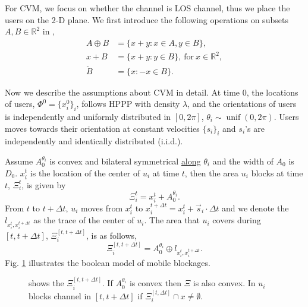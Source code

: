 \documentclass[10pt, conference, letterpaper]{IEEEtran}
\DeclareMathOperator*{\unif}{unif}
\begin{document}
For CVM, we focus on whether the channel is LOS channel, thus we place the users on the 2-D plane. 
We first introduce the following operations on subsets $A, B\in \mathbb{R}^2$ in \cite{stochasticgeometry}, 
\begin{equation*}
\begin{split}
A \oplus B & = \{x+y:x\in A, y\in B\},\\
x + B & = \{x+y:y\in B\}, \mathrm{~for~} x\in \mathbb{R}^2, \\
\check{B} & = \{x: -x \in B\}.
\end{split}
\end{equation*}

Now we describe the assumptions about CVM in detail. At time $0$, the locations of users, $\Phi^0 = \{x_i^0\}_i$, follows HPPP with density $\lambda$, and the orientations of users is independently and uniformly distributed in $[0, 2\pi]$, $\theta_i \sim \unif(0, 2\pi)$. Users moves towards their orientation at constant velocities $\{s_i\}_i$ and $s_i$'s are independently and identically distributed (i.i.d.).

Assume $A_0^{\theta_i}$ is convex and bilateral symmetrical \underline{along} $\theta_i$ and the width of $A_0$ is $D_0$. $x_i^t$ is the location of the center of $u_i$ at time $t$, then the area $u_i$ blocks at time $t$, $\Xi_{i}^t$, is given by 
\begin{equation*}
\Xi_{i}^t = x_i^t + A_0^{\theta_i}.
\end{equation*}
From $t$ to $t+\Delta t$, $u_i$ moves from $x_i^t$ to $x_i^{t+\Delta t} = x_i^t + \vec{s}_i\cdot \Delta t$ and we denote the $l_{x_i^t, x_i ^{t+\Delta t}}$ as the trace of the center of $u_i$. The area that $u_i$ covers during $[t, t+\Delta t]$, $\Xi_i^{[t, t+\Delta t]}$, is as follows, 
\begin{equation*} %
\Xi_i^{[t, t+\Delta t]} = A_0^{\theta_i} \oplus l_{x_i^t, x_i ^{t+\Delta t} }.
\end{equation*}
Fig. \ref{fig:boolean} illustrates the boolean model of mobile blockages.

\begin{figure}
	\centering
	\mbox{}
	\mbox{}
	\caption[]{ shows the $\Xi_i^{[t, t+\Delta t]}$. If $A_0^{\theta_i}$ is convex then $\Xi$ is also convex. In  $u_i$ blocks channel in $[t, t+ \Delta t]$ if $\Xi_i^{[t, \Delta t]}\cap x \neq \emptyset$. }
	\label{fig:boolean}
\end{figure}
\end{document}
